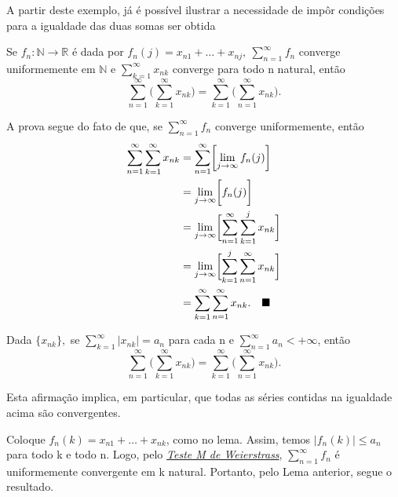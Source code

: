 \documentclass[../analysis_notes.tex]{subfiles}
\begin{document}
A partir deste exemplo, já é possível ilustrar a necessidade de impôr condições para a igualdade das duas somas ser obtida
\begin{lemma*}
	Se \(f_{n}:\mathbb{N}\rightarrow \mathbb{R}\) é dada por \(f_{n}(j)=x_{n1}+\dotsc +x_{nj},\:\sum\limits_{n=1}^{\infty}f_{n}\) converge uniformemente em \(\mathbb{N}\) e \(\sum\limits_{k=1}^{\infty}x_{nk}\) converge para todo n natural, então
	\[
		\sum\limits_{n=1}^{\infty}\biggl(\sum\limits_{k=1}^{\infty}x_{nk}\biggr)=\sum\limits_{k=1}^{\infty}\biggl(\sum\limits_{n=1}^{\infty}x_{nk}\biggr).
	\]
\end{lemma*}
\begin{proof*}
	A prova segue do fato de que, se \(\sum\limits_{n=1}^{\infty}f_{n}\) converge uniformemente, então
	\begin{align*}
		\sum\limits_{n=1}^{\infty}\sum\limits_{k=1}^{\infty}x_{nk} & = \sum\limits_{n=1}^{\infty}\biggl[\lim_{j\to \infty}f_{n}(j)\biggr]                    \\
		                                                           & = \lim_{j\to \infty}\biggl[f_{n}(j)\biggr]                                              \\
		                                                           & = \lim_{j\to \infty}\biggl[\sum\limits_{n=1}^{\infty}\sum\limits_{k=1}^{j}x_{nk}\biggr] \\
		                                                           & = \lim_{j\to \infty}\biggl[\sum\limits_{k=1}^{j}\sum\limits_{n=1}^{\infty}x_{nk}\biggr] \\
		                                                           & = \sum\limits_{k=1}^{\infty}\sum\limits_{n=1}^{\infty}x_{nk}.\quad \text{$\blacksquare$}
	\end{align*}
\end{proof*}
\begin{theorem*}
	Dada \(\{x_{nk}\},\) se \(\sum\limits_{k=1}^{\infty}|x_{nk}|=a_{n}\) para cada n e \(\sum\limits_{n=1}^{\infty}a_{n}<+\infty\), então
	\[
		\sum\limits_{n=1}^{\infty}\biggl(\sum\limits_{k=1}^{\infty}x_{nk}\biggr)=\sum\limits_{k=1}^{\infty}\biggl(\sum\limits_{n=1}^{\infty}x_{nk}\biggr).
	\]
\end{theorem*}
Esta afirmação implica, em particular, que todas as séries contidas na igualdade acima são convergentes.
\begin{proof*}
	Coloque \(f_{n}(k)=x_{n1}+\dotsc +x_{nk}\), como no lema. Assim, temos \(|f_{n}(k )|\leq a_{n}\) para todo k e todo n. Logo, pelo \hyperlink{weierstrass_m}{\textit{Teste M de Weierstrass}}, \(\sum\limits_{n=1}^{\infty}f_{n}\) é uniformemente convergente em k natural. Portanto, pelo Lema anterior, segue o resultado. \qedsymbol
\end{proof*}
\end{document}
